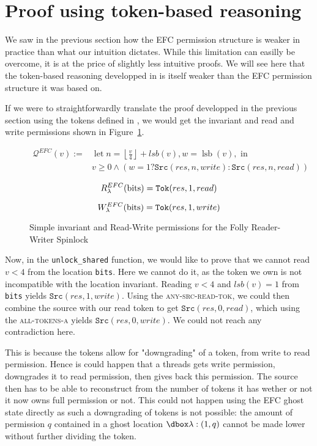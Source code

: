 \section{Proof using token-based reasoning}
We saw in the previous section how the EFC permission structure is weaker in practice than what our intuition dictates. While this limitation can easilly be overcome, it is at the price of slightly less intuitive proofs. We will see here that the token-based reasoning developped in \cite{pascal} is itself weaker than the EFC permission structure it was based on.

If we were to straightforwardly translate the proof developped in the previous section using the tokens defined in \cite{pascal}, we would get the invariant and read and write permissions shown in Figure~\ref{fig:invToksRWFolly}.

\begin{figure}
$$\begin{aligned} \mathcal{Q}^{EFC}(v) :=& \operatorname{let} n=\left\lfloor\frac{v}{4}\right\rfloor + lsb(v), w=\operatorname{lsb}(v), \text { in } \\ & v \geq 0 \wedge (w = 1 ? \texttt{Src}(res, n, write) : \texttt{Src}(res, n, read))
\end{aligned} $$

$$R_{\lambda}^{EFC}(\text{bits}) = \texttt{Tok}(res, 1, read)$$

$$W_{\lambda}^{EFC}(\text{bits}) = \texttt{Tok}(res, 1, write)$$
		\caption{Simple invariant and Read-Write permissions for the Folly Reader-Writer Spinlock}
		\label{fig:invToksRWFolly}
\end{figure}

Now, in the \texttt{unlock\_shared} function, we would like to prove that we cannot read $v < 4$ from the location \texttt{bits}. Here we cannot do it, as the token we own is not incompatible with the location invariant. Reading $v < 4$ and $lsb(v) = 1$ from \texttt{bits} yields $\texttt{Src}(res, 1, write)$. Using the \textsc{any-src-read-tok}, we could then combine the source with our read token to get $\texttt{Src}(res, 0, read)$, which using the \textsc{all-tokens-a} yields $\texttt{Src}(res, 0, write)$. We could not reach any contradiction here.

This is because the tokens allow for "downgrading" of a token, from write to read permission. Hence is could happen that a threads gets write permission, downgrades it to read permission, then gives back this permission. The source then has to be able to reconstruct from the number of tokens it has wether or not it now owns full permission or not. This could not happen using the EFC ghost state directly as such a downgrading of tokens is not possible: the amount of permission $q$ contained in a ghost location $\ghost{\lambda : (1, q)}$ cannot be made lower without further dividing the token.

